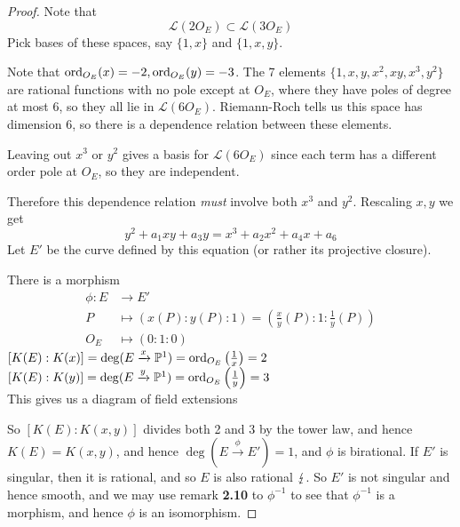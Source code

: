\documentclass[10pt,a4paper]{article}
\begin{document}
\begin{proof}
  Note that
  \[\mathscr{L}(2O_E) \subset \mathscr{L}(3O_E)\]
  Pick bases of these spaces, say $\{1, x\}$ and $\{1, x, y\}$.

  Note that $\operatorname{ord}_{O_E}(x) = -2, \operatorname{ord}_{O_E}(y) = -3$. The 7 elements $\{1, x, y, x^2, xy, x^3, y^2\}$ are rational functions with no pole except at $O_E$, where they have poles of degree at most 6, so they all lie in $\mathscr{L}(6O_E)$. Riemann-Roch tells us this space has dimension 6, so there is a dependence relation between these elements.

  Leaving out $x^3$ or $y^2$ gives a basis for $\mathscr{L}(6O_E)$ since each term has a different order pole at $O_E$, so they are independent.

  Therefore this dependence relation \textit{must} involve both $x^3$ and $y^2$. Rescaling $x, y$ we get
  \[ y^2 + a_1 xy + a_3 y = x^3 + a_2 x^2 + a_4 x + a_6 \]
  Let $E'$ be the curve defined by this equation (or rather its projective closure).

  There is a morphism
  \begin{align*}
    \phi: E &\to E'\\
    P &\mapsto (x(P): y(P): 1) = \left(\frac{x}{y}(P) : 1 : \frac{1}{y}(P)\right)\\
    O_E &\mapsto (0:1:0)
  \end{align*}
  $[K(E):K(x)] = \deg(E\xrightarrow{x}\mathbb{P}^1) = \operatorname{ord}_{O_E}\left(\frac{1}{x}\right) = 2$\\
  $[K(E):K(y)] = \deg(E\xrightarrow{y}\mathbb{P}^1) = \operatorname{ord}_{O_E}\left(\frac{1}{y}\right) = 3$\\

  This gives us a diagram of field extensions

  So $[K(E):K(x,y)]$ divides both 2 and 3 by the tower law, and hence $K(E) = K(x,y)$, and hence $\deg(E\xrightarrow{\phi}E') = 1$, and $\phi$ is birational. If $E'$ is singular, then it is rational, and so $E$ is also rational $\lightning$. So $E'$ is not singular and hence smooth, and we may use remark \textbf{2.10} to $\phi^{-1}$ to see that $\phi^{-1}$ is a morphism, and hence $\phi$ is an isomorphism.
\end{proof}
\end{document}
